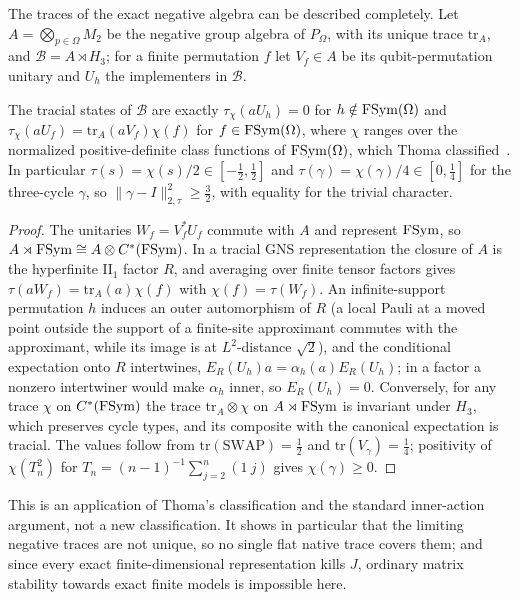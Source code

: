 The traces of the exact negative algebra can be described completely. Let $A=\bigotimes_{p\in\Omega}M_2$ be the negative group algebra of
$P_\Omega$, with its unique trace $\mathrm{tr}_A$, and $\mathcal B=A\rtimes H_3$; for a finite permutation $f$ let $V_f\in A$ be its
qubit-permutation unitary and $U_h$ the implementers in $\mathcal B$.

\begin{proposition}\label{prop:point-traces}
The tracial states of $\mathcal B$ are exactly $\tau_\chi(aU_h)=0$ for $h\notin\operatorname{FSym}(\Omega)$ and $\tau_\chi(aU_f)=\mathrm{tr}_A(aV_f)\chi(f)$ for
$f\in\operatorname{FSym}(\Omega)$, where $\chi$ ranges over the normalized positive-definite class functions of $\operatorname{FSym}(\Omega)$, which Thoma
classified~\cite{Tho64}. In particular $\tau(s)=\chi(s)/2\in[-\frac12,\frac12]$ and $\tau(\gamma)=\chi(\gamma)/4\in[0,\frac14]$ for the
three-cycle $\gamma$, so $\|\gamma-I\|_{2,\tau}^2\ge\frac32$, with equality for the trivial character.
\end{proposition}

\begin{proof}
The unitaries $W_f=V_f^*U_f$ commute with $A$ and represent $\operatorname{FSym}$, so $A\rtimes\operatorname{FSym}\cong A\otimes C^*(\operatorname{FSym})$. In a tracial GNS
representation the closure of $A$ is the hyperfinite $\mathrm{II}_1$ factor $R$, and averaging over finite tensor factors gives
$\tau(aW_f)=\mathrm{tr}_A(a)\chi(f)$ with $\chi(f)=\tau(W_f)$. An infinite-support permutation $h$ induces an outer automorphism of $R$
(a local Pauli at a moved point outside the support of a finite-site approximant commutes with the approximant, while its image
is at $L^2$-distance $\sqrt2$), and the conditional expectation onto $R$ intertwines, $E_R(U_h)a=\alpha_h(a)E_R(U_h)$; in a factor a
nonzero intertwiner would make $\alpha_h$ inner, so $E_R(U_h)=0$. Conversely, for any trace $\chi$ on $C^*(\operatorname{FSym})$ the trace
$\mathrm{tr}_A\otimes\chi$ on $A\rtimes\operatorname{FSym}$ is invariant under $H_3$, which preserves cycle types, and its composite with the canonical
expectation is tracial. The values follow from $\mathrm{tr}(\mathrm{SWAP})=\frac12$ and $\mathrm{tr}(V_\gamma)=\frac14$; positivity of
$\chi(T_n^2)$ for $T_n=(n-1)^{-1}\sum_{j=2}^n(1\ j)$ gives $\chi(\gamma)\ge0$.
\end{proof}

This is an application of Thoma's classification and the standard inner-action argument, not a new classification. It shows
in particular that the limiting negative traces are not unique, so no single flat native trace covers them; and since every
exact finite-dimensional representation kills $J$, ordinary matrix stability towards exact finite models is impossible here.

